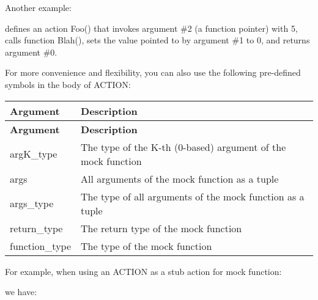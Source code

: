 Another example\+: 
\begin{DoxyCode}{0}
\DoxyCodeLine{\}}
\end{DoxyCode}
 defines an action {\ttfamily Foo()} that invokes argument \#2 (a function pointer) with 5, calls function {\ttfamily Blah()}, sets the value pointed to by argument \#1 to 0, and returns argument \#0.

For more convenience and flexibility, you can also use the following pre-\/defined symbols in the body of {\ttfamily A\+C\+T\+I\+ON}\+:

\tabulinesep=1mm
\begin{longtabu}spread 0pt [c]{*{2}{|X[-1]}|}
\hline
\cellcolor{\tableheadbgcolor}\textbf{ Argument  }&\cellcolor{\tableheadbgcolor}\textbf{ Description   }\\
\endfirsthead
\hline
\endfoot
\hline
\cellcolor{\tableheadbgcolor}\textbf{ Argument  }&\cellcolor{\tableheadbgcolor}\textbf{ Description   }\\
\endhead
{\ttfamily arg\+K\+\_\+type}  &The type of the K-\/th (0-\/based) argument of the mock function   \\
{\ttfamily args}  &All arguments of the mock function as a tuple   \\
{\ttfamily args\+\_\+type}  &The type of all arguments of the mock function as a tuple   \\
{\ttfamily return\+\_\+type}  &The return type of the mock function   \\
{\ttfamily function\+\_\+type}  &The type of the mock function   \\
\end{longtabu}


For example, when using an {\ttfamily A\+C\+T\+I\+ON} as a stub action for mock function\+: 
\begin{DoxyCode}{0}
\end{DoxyCode}
 we have\+:

